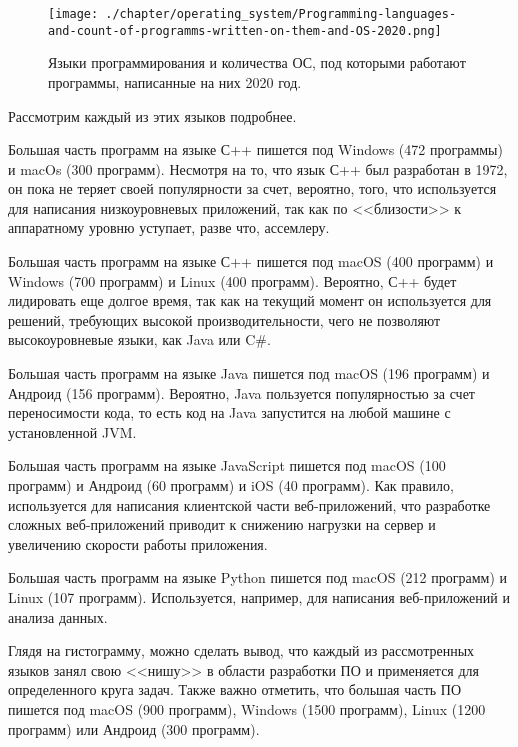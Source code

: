 \begin{figure*}[h!]
	\texttt{[image: ./chapter/operating\_system/Programming-languages-and-count-of-programms-written-on-them-and-OS-2020.png]}
	\caption{Языки программирования и количества ОС, под которыми работают программы, написанные на них 2020 год.}
	\label{fig:count-software-written-on-languages}
\end{figure*}

Рассмотрим каждый из этих языков подробнее.

Большая часть программ на языке С++ пишется под Windows (472 программы) и macOs (300 программ). Несмотря на то, что язык С++ был разработан в 1972, он пока не теряет своей популярности за счет, вероятно, того, что используется для написания низкоуровневых приложений, так как по <<близости>> к аппаратному уровню уступает, разве что, ассемлеру.

Большая часть программ на языке С++ пишется под macOS (400 программ) и Windows (700 программ) и Linux (400 программ). Вероятно, С++ будет лидировать еще долгое время, так как на текущий момент он используется для решений, требующих высокой производительности, чего не позволяют высокоуровневые языки, как Java или C\#.

Большая часть программ на языке Java пишется под macOS (196 программ) и Андроид (156 программ). Вероятно, Java пользуется популярностью за счет переносимости\footnotemark {}
кода, то есть код на Java запустится на любой машине с установленной JVM\footnotemark.

Большая часть программ на языке JavaScript пишется под macOS (100 программ) и Андроид (60 программ) и iOS (40 программ). Как правило, используется для написания клиентской части веб-приложений, что разработке сложных веб-приложений приводит к снижению нагрузки на сервер и увеличению скорости работы приложения.

Большая часть программ на языке Python пишется под macOS (212 программ) и Linux (107 программ). Используется, например, для написания веб-приложений и анализа данных.

Глядя на гистограмму, можно сделать вывод, что каждый из рассмотренных языков занял свою <<нишу>> в области разработки ПО и применяется для определенного круга задач. Также важно отметить, что большая часть ПО пишется под macOS (900 программ), Windows (1500 программ), Linux (1200 программ) или Андроид (300 программ).